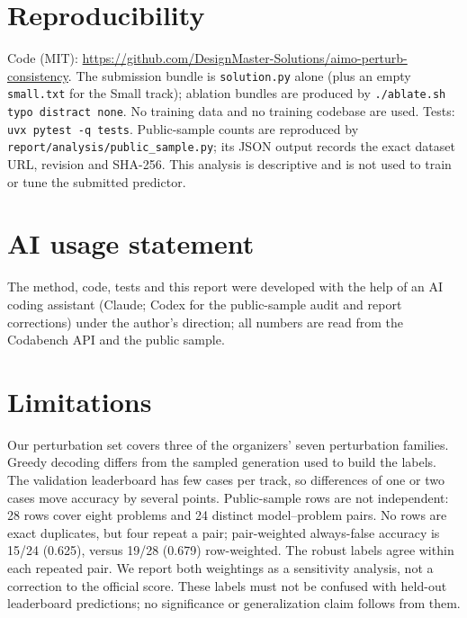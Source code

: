 \documentclass{article}
\begin{document}
\section*{Reproducibility}
Code (MIT): \url{https://github.com/DesignMaster-Solutions/aimo-perturb-consistency}. The submission bundle is \texttt{solution.py} alone (plus an empty \texttt{small.txt} for the Small track); ablation bundles are produced by \texttt{./ablate.sh typo distract none}. No training data and no training codebase are used. Tests: \texttt{uvx pytest -q tests}. Public-sample counts are reproduced by \texttt{report/analysis/public\_sample.py}; its JSON output records the exact dataset URL, revision and SHA-256. This analysis is descriptive and is not used to train or tune the submitted predictor.

\section*{AI usage statement}
The method, code, tests and this report were developed with the help of an AI coding assistant (Claude; Codex for the public-sample audit and report corrections) under the author's direction; all numbers are read from the Codabench API and the public sample.

\section*{Limitations}
Our perturbation set covers three of the organizers' seven perturbation families. Greedy decoding differs from the sampled generation used to build the labels. The validation leaderboard has few cases per track, so differences of one or two cases move accuracy by several points. Public-sample rows are not independent: 28 rows cover eight problems and 24 distinct model--problem pairs. No rows are exact duplicates, but four repeat a pair; pair-weighted always-false accuracy is 15/24 (0.625), versus 19/28 (0.679) row-weighted. The robust labels agree within each repeated pair. We report both weightings as a sensitivity analysis, not a correction to the official score. These labels must not be confused with held-out leaderboard predictions; no significance or generalization claim follows from them.
\end{document}

